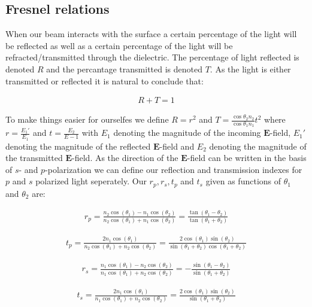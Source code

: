 
\subsection{Fresnel relations}


When our beam interacts with the surface a certain percentage of the light will be reflected as well as a certain percentage of the light will be refracted/transmitted through the dielectric. The percentage of light reflected is denoted $R$ and the percantage transmitted is denoted $T$. As the light is either transmitted or reflected it is natural to conclude that:

\begin{align}
R+T=1
\end{align}

To make things easier for ourselfes we define $R=r^2$ and $T=\frac{\cos{\theta_2}n_2}{\cos{\theta_1}n_1}t^2$ where $r=\frac{E_1'}{E_1}$ and  $t=\frac{E_2}{E-1}$ with $E_1$ denoting the magnitude of the incoming $\textbf{E}$-field, $E_1'$ denoting the magnitude of the reflected $\textbf{E}$-field and $E_2$ denoting the magnitude of the transmitted $\textbf{E}$-field. As the direction of the $\textbf{E}$-field can be written in the basis of $s$- and $p$-polarization we can define our reflection and transmission indexes for $p$ and $s$ polarized light seperately. Our $r_p,r_s,t_p$ and $t_s$ given as functions of $\theta_1$ and $\theta_2$ are:

\begin{align}
r_p=\frac{n_{2}\cos(\theta_1)-n_1\cos(\theta_2)}{n_2\cos(\theta_1)+n_1\cos(\theta_2)} = \frac{\tan(\theta_1-\theta_2)}{\tan(\theta_1+\theta_2)}
\end{align}

\begin{align}
t_p = \frac{2n_1\cos(\theta_1)}{n_2\cos(\theta_1)+n_2\cos(\theta_2)} 
= \frac{2\cos(\theta_1)\sin(\theta_2)}{\sin(\theta_1+\theta_2)\cos(\theta_1+\theta_2)}
\end{align}

\begin{align}
r_{s} = \frac{n_1\cos(\theta_1)-n_2\cos(\theta_2)}{n_1\cos(\theta_1)+n_2\cos(\theta_2)}= -\frac{\sin(\theta_1-\theta_2)}{\sin(\theta_1+\theta_2)}
\end{align}

\begin{align}
t_s = \frac{2n_1\cos(\theta_1)}{n_1\cos(\theta_1)+n_2\cos(\theta_2)} = \frac{2\cos(\theta_1)\sin(\theta_2)}{\sin(\theta_1+\theta_2)}
\end{align}

